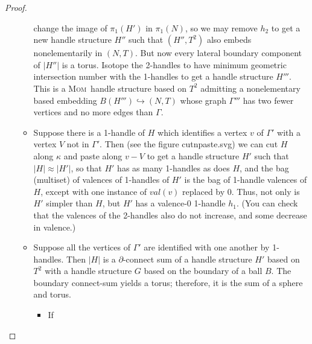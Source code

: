 \documentclass{article}
\theoremstyle{plain}
\theoremstyle{plain}
\theoremstyle{definition}
\numberwithin{equation}{section}
\newcommand{\MOM}{\textsc{Mom}}
\begin{document}
\begin{proof}
\begin{itemize}
\begin{itemize}
		change the image of $\pi_1(H')$ in $\pi_1(N)$, so we may
		remove $h_2$ to get a new handle structure $H''$ such that
		$(H'', T^2)$ also embeds nonelementarily in $(N, T)$. But
		now every lateral boundary component of $|H''|$ is a torus.
		Isotope the 2-handles to have minimum geometric
		intersection number with the 1-handles to get a handle structure
		$H'''$. This is a \MOM\ handle structure based on $T^2$
		admitting a nonelementary based embedding 
		$B(H''') \hookrightarrow (N, T)$ whose graph $\Gamma'''$
		has two fewer vertices and no more edges than $\Gamma$.
	\item 
		Suppose there is a 1-handle of $H$ which identifies a
		vertex $v$ of $\Gamma'$ with a vertex $V$ not in $\Gamma'$.
		Then (see the figure cutnpaste.svg) we can cut $H$ 
		along $\kappa$ and paste along $v-V$
		to get a handle structure $H'$ such that $|H| \approx |H'|$,
		so that $H'$ has as many 1-handles as does $H$, and the
		bag (multiset) of valences of 1-handles of $H'$ is the
		bag of 1-handle valences of $H$, except with one
		instance of $val(v)$ replaced by $0$. Thus, not only 
		is $H'$ simpler than $H$, but $H'$ has a valence-0 1-handle $h_1$.
		(You can check that the valences of the 2-handles also do
		not increase, and some decrease in valence.)
	\item
		Suppose all the vertices of $\Gamma'$ are identified
		with one another by 1-handles. Then $|H|$ is a
		$\partial$-connect sum of a handle structure
		$H'$ based on $T^2$ with a handle structure $G$
		based on the boundary of a ball $B$. The boundary
		connect-sum yields a torus; therefore, it is the
		sum of a sphere and torus.
		\begin{itemize}
		\item
			If 
		\end{itemize}
	\end{itemize}
\end{itemize}
\end{proof}
\end{document}
